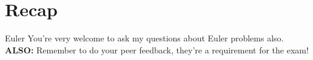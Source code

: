 \documentclass[10pt,danish,t,10pt]{beamer}
\begin{document}
\section{Recap}
\begin{frame}{Euler}
    You're very welcome to ask my questions about Euler problems also.
    \textbf{ALSO:} Remember to do your peer feedback, they're a requirement for the exam!
\end{frame}
\end{document}
